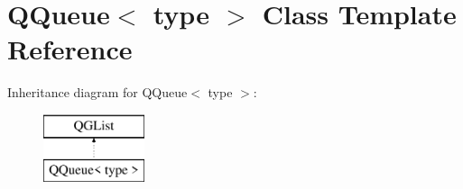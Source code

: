 \hypertarget{class_q_queue}{}\section{Q\+Queue$<$ type $>$ Class Template Reference}
\label{class_q_queue}
Inheritance diagram for Q\+Queue$<$ type $>$\+:\begin{figure}[H]
\begin{center}
\leavevmode
\includegraphics[height=2.000000cm]{class_q_queue}
\end{center}
\end{figure}
